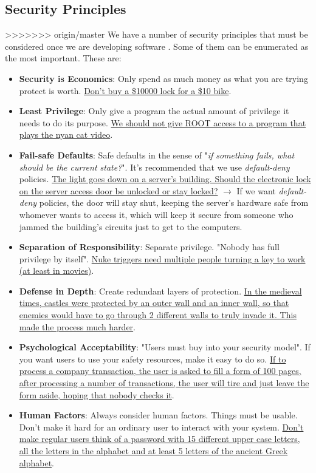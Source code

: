 \documentclass[11pt]{article}
\begin{document}
\subsection{Security Principles}
\label{sec:orgfb2b01f}
>>>>>>> origin/master
We have a number of security principles that must be considered once we are developing software \cite{secPrinc}. Some of them can be enumerated as the most important. These are:
\begin{itemize}
\item \textbf{Security is Economics}: Only spend as much money as what you are trying protect is worth. \uline{Don't buy a \$10000 lock for a \$10 bike}.
\item \textbf{Least Privilege}: Only give a program the actual amount of privilege it needs to do its purpose. \uline{We should not give ROOT access to a program that plays the nyan cat video}.
\item \textbf{Fail-safe Defaults}: Safe defaults in the sense of "\emph{if something fails, what should be the current state?}". It's recommended that we use \emph{default-deny} policies. \uline{The light goes down on a server's building. Should the electronic lock on the server access door be unlocked or stay locked?} \(\to\) If we want \emph{default-deny} policies, the door will stay shut, keeping the server's hardware safe from whomever wants to access it, which will keep it secure from someone who jammed the building's circuits just to get to the computers.
\item \textbf{Separation of Responsibility}: Separate privilege. "Nobody has full privilege by itself". \uline{Nuke triggers need multiple people turning a key to work (at least in movies)}.
\item \textbf{Defense in Depth}: Create redundant layers of protection. \uline{In the medieval times, castles were protected by an outer wall and an inner wall, so that enemies would have to go through 2 different walls to truly invade it. This made the process much harder}.
\item \textbf{Psychological Acceptability}: "Users must buy into your security model". If you want users to use your safety resources, make it easy to do so. \uline{If to process a company transaction, the user is asked to fill a form of 100 pages, after processing a number of transactions, the user will tire and just leave the form aside, hoping that nobody checks it}.
\item \textbf{Human Factors}: Always consider human factors. Things must be usable. Don't make it hard for an ordinary user to interact with your system. \uline{Don't make regular users think of a password with 15 different upper case letters, all the letters in the alphabet and at least 5 letters of the ancient Greek alphabet}.

\end{itemize}
\end{document}

